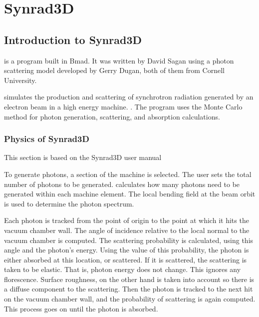 
\chapter{Synrad3D} %

\label{soft} %





\section{Introduction to Synrad3D}
\label{Synrad3d}
\srthree is a program built in Bmad. It was written by David Sagan using a photon scattering model developed by Gerry Dugan, both of them from Cornell University. 
 
\srthree  simulates the production and scattering of synchrotron radiation generated by an electron beam in a high energy machine. \citep{syn}. The \srthree program uses the Monte Carlo method for photon generation, scattering, and absorption calculations.
\subsection{Physics of Synrad3D}


This section is based on the Synrad3D user manual\cite{syn} 

To generate photons, a section of the machine is selected.  The user sets the total number of photons to be generated. \srthree calculates how many photons need to be generated within each machine element. The local bending field at the beam orbit is used to determine the photon spectrum.

Each photon is tracked from the point of origin to the point at which it hits the vacuum chamber wall. The angle of incidence relative to the local normal to the vacuum chamber is computed. The scattering probability is calculated, using this angle and the photon's energy. Using the value of this probability, the photon is either absorbed at this location, or scattered. If it is scattered, the scattering is taken to be elastic. That is, photon energy does not change. This ignores any florescence. Surface roughness, on the other hand is taken into account so there is a diffuse component to the scattering. Then the photon is tracked to the next hit on the vacuum chamber wall, and the probability of scattering is again computed. This process goes on until the photon is absorbed.
